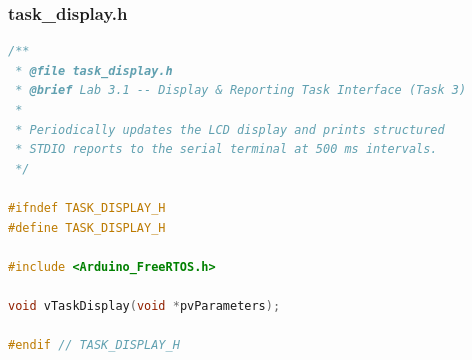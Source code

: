 \subsubsection{task\_display.h}
\begin{lstlisting}[language=C++, caption=task\_display.h --- Display and Reporting Task Interface]
/**
 * @file task_display.h
 * @brief Lab 3.1 -- Display & Reporting Task Interface (Task 3)
 *
 * Periodically updates the LCD display and prints structured
 * STDIO reports to the serial terminal at 500 ms intervals.
 */

#ifndef TASK_DISPLAY_H
#define TASK_DISPLAY_H

#include <Arduino_FreeRTOS.h>

void vTaskDisplay(void *pvParameters);

#endif // TASK_DISPLAY_H
\end{lstlisting}

